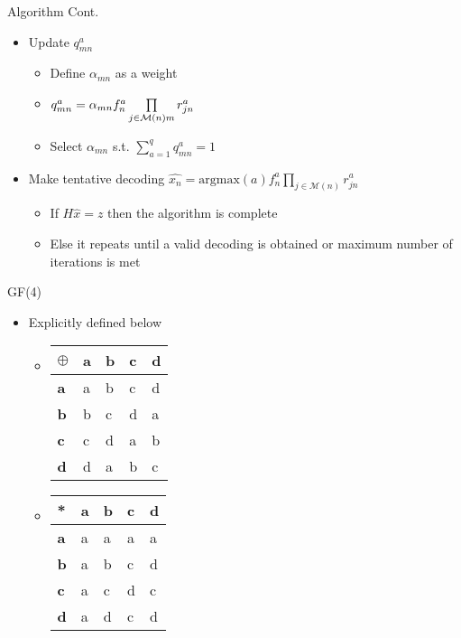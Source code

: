 \documentclass[10pt,ignorenonframetext,]{beamer}
\providecommand{\tightlist}{%
  \setlength{\itemsep}{0pt}\setlength{\parskip}{0pt}}
\begin{document}
\begin{frame}{Algorithm Cont.}
\protect\hypertarget{algorithm-cont.}{}
\begin{itemize}[<+->]
\tightlist
\item
  Update \(q^a_{mn}\)

  \begin{itemize}[<+->]
  \tightlist
  \item
    Define \(\alpha_{mn}\) as a weight
  \item
    \(q^a_{mn} = \alpha_{mn} f^a_n\prod\limits_{j\in\mathcal{M}(n)\\m}r^a_{jn}\)
  \item
    Select \(\alpha_{mn}\) s.t. \(\sum_{a=1}^q q^a_{mn} = 1\)
  \end{itemize}
\item
  Make tentative decoding
  \(\hat{x_n} = \text{argmax}(a)f^a_n\prod\limits_{j\in\mathcal{M}(n)}r^a_{jn}\)

  \begin{itemize}[<+->]
  \tightlist
  \item
    If \(H\hat{x} = z\) then the algorithm is complete
  \item
    Else it repeats until a valid decoding is obtained or maximum number
    of iterations is met
  \end{itemize}
\end{itemize}
\end{frame}

\begin{frame}{GF(4)}
\protect\hypertarget{gf4}{}
\begin{itemize}[<+->]
\tightlist
\item
  Explicitly defined below

  \begin{itemize}[<+->]
  \item
    \begin{longtable}[]{@{}lllll@{}}
    \toprule
    \textbf{\(\oplus\)} & \textbf{a} & \textbf{b} & \textbf{c} &
    \textbf{d} \\
    \midrule
    \endhead
    \textbf{a} & a & b & c & d \\
    \textbf{b} & b & c & d & a \\
    \textbf{c} & c & d & a & b \\
    \textbf{d} & d & a & b & c \\
    \bottomrule
    \end{longtable}
  \item
    \begin{longtable}[]{@{}lllll@{}}
    \toprule
    \textbf{*} & \textbf{a} & \textbf{b} & \textbf{c} & \textbf{d} \\
    \midrule
    \endhead
    \textbf{a} & a & a & a & a \\
    \textbf{b} & a & b & c & d \\
    \textbf{c} & a & c & d & c \\
    \textbf{d} & a & d & c & d \\
    \bottomrule
    \end{longtable}
  \end{itemize}
\end{itemize}
\end{frame}
\end{document}
